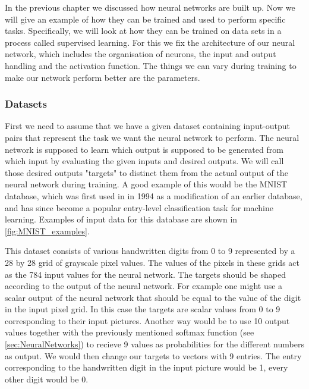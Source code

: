 In the previous chapter we discussed how neural networks are built up. Now we will give an example of how they can be trained and used to perform specific tasks. Specifically, we will look at how they can be trained on data sets in a process called supervised learning. For this we fix the architecture of our neural network, which includes the organisation of neurons, the input and output handling and the activation function. The things we can vary during training to make our network perform better are the parameters.

\subsubsection{Datasets}
First we need to assume that we have a given dataset containing input-output pairs that represent the task we want the neural network to perform. The neural network is supposed to learn which output is supposed to be generated from which input by evaluating the given inputs and desired outputs. We will call those desired outputs "targets" to distinct them from the actual output of the neural network during training. A good example of this would be the MNIST database, which was first used in \cite{firstMNISTpaper} in 1994 as a modification of an earlier database, and has since become a popular entry-level classification task for machine learning. Examples of input data for this database are shown in \cref{fig:MNIST_examples}. 

This dataset consists of various handwritten digits from 0 to 9 represented by a 28 by 28 grid of grayscale pixel values. The values of the pixels in these grids act as the 784 input values for the neural network. The targets should be shaped according to the output of the neural network. For example one might use a scalar output of the neural network that should be equal to the value of the digit in the input pixel grid. In this case the targets are scalar values from 0 to 9 corresponding to their input pictures. Another way would be to use 10 output values together with the previously mentioned softmax function (see \cref{sec:NeuralNetworks}) to recieve 9 values as probabilities for the different numbers as output. We would then change our targets to vectors with 9 entries. The entry corresponding to the handwritten digit in the input picture would be 1, every other digit would be 0.\\

